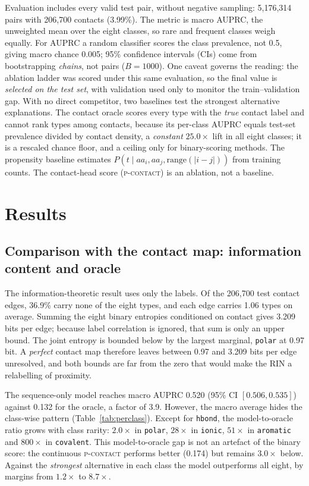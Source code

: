 \documentclass[12pt]{article}
\begin{document}
Evaluation includes every valid test pair, without negative sampling: 5,176,314 pairs
with 206,700 contacts (3.99\%). The metric is macro AUPRC, the unweighted mean over the
eight classes, so rare and frequent classes weigh equally. For AUPRC a random classifier
scores the class prevalence, not 0.5, giving macro chance 0.005; 95\% confidence
intervals (CIs) come from bootstrapping \emph{chains}, not pairs ($B=1000$). One caveat
governs the reading: the ablation ladder was scored under this same evaluation, so the
final value is \emph{selected on the test set}, with validation used only to monitor the
train--validation gap. With no direct competitor, two baselines test the strongest
alternative explanations. The contact oracle scores every type with the \emph{true}
contact label and cannot rank types among contacts, because its per-class AUPRC equals
test-set prevalence divided by contact density, a \emph{constant} $25.0\times$ lift in
all eight classes; it is a rescaled chance floor, and a ceiling only for binary-scoring
methods. The propensity baseline estimates
$P(t \mid aa_i, aa_j, \mathrm{range}(|i-j|))$ from training counts. The contact-head
score (\textsc{p-contact}) is an ablation, not a baseline.

\section{Results}
\label{sec:results}

\subsection{Comparison with the contact map: information content and oracle}
\label{sec:thesis}

The information-theoretic result uses only the labels. Of the 206,700 test contact edges,
36.9\% carry none of the eight types, and each edge carries 1.06 types on average.
Summing the eight binary entropies conditioned on contact gives 3.209 bits per edge;
because label correlation is ignored, that sum is only an upper bound. The joint entropy
is bounded below by the largest marginal, \texttt{polar} at 0.97 bit. A \emph{perfect}
contact map therefore leaves between 0.97 and 3.209 bits per edge unresolved, and both
bounds are far from the zero that would make the RIN a relabelling of proximity.

The sequence-only model reaches macro AUPRC 0.520 (95\% CI $[0.506, 0.535]$) against
0.132 for the oracle, a factor of 3.9. However, the macro average hides the class-wise
pattern (Table~\ref{tab:perclass}). Except for \texttt{hbond}, the model-to-oracle
ratio grows with class rarity: $2.0\times$ in \texttt{polar},
$28\times$ in \texttt{ionic}, $51\times$ in \texttt{aromatic} and $800\times$ in
\texttt{covalent}. This model-to-oracle gap is not an artefact
of the binary score: the continuous \textsc{p-contact} performs better (0.174) but
remains $3.0\times$ below. Against the \emph{strongest} alternative in each class the
model outperforms all eight, by margins from $1.2\times$ to $8.7\times$.
\end{document}
